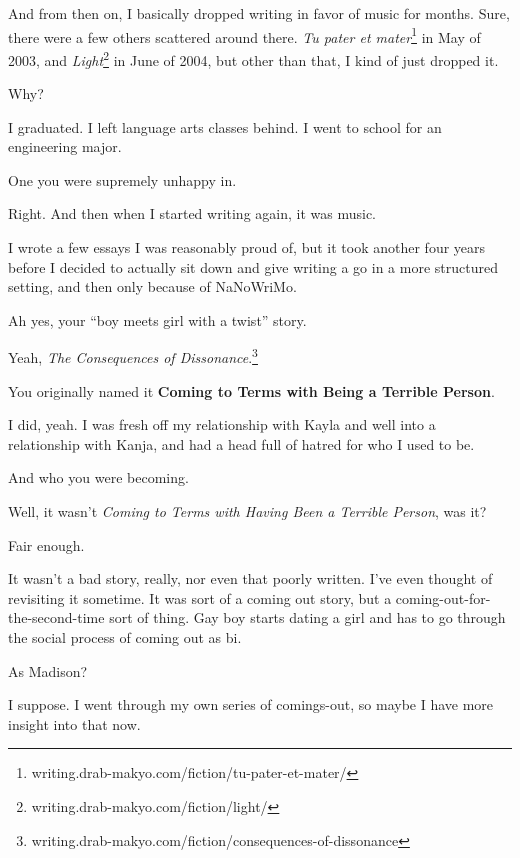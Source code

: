 \begin{paracol}{2}
\begin{leftcolumn}
And from then on, I basically dropped writing in favor of music for months. Sure, there were a few others scattered around there. \emph{Tu pater et mater}\footnote{writing.drab-makyo.com/fiction/tu-pater-et-mater/} in May of 2003, and \emph{Light}\footnote{writing.drab-makyo.com/fiction/light/} in June of 2004, but other than that, I kind of just dropped it.

\begin{ally}
Why?
\end{ally}
I graduated. I left language arts classes behind. I went to school for an engineering major.

\begin{ally}
One you were supremely unhappy in.
\end{ally}
Right. And then when I started writing again, it was music.

I wrote a few essays I was reasonably proud of, but it took another four years before I decided to actually sit down and give writing a go in a more structured setting, and then only because of NaNoWriMo.

\begin{ally}
Ah yes, your ``boy meets girl with a twist'' story.
\end{ally}
Yeah, \emph{The Consequences of Dissonance}.\footnote{writing.drab-makyo.com/fiction/consequences-of-dissonance}

\begin{ally}
You originally named it \textbf{Coming to Terms with Being a Terrible Person}.
\end{ally}
I did, yeah. I was fresh off my relationship with Kayla and well into a relationship with Kanja, and had a head full of hatred for who I used to be.

\begin{ally}
And who you were becoming.
\end{ally}
Well, it wasn't \emph{Coming to Terms with Having Been a Terrible Person}, was it?

\begin{ally}
Fair enough.
\end{ally}
It wasn't a bad story, really, nor even that poorly written. I've even thought of revisiting it sometime. It was sort of a coming out story, but a coming-out-for-the-second-time sort of thing. Gay boy starts dating a girl and has to go through the social process of coming out as bi.

\begin{ally}
As Madison?
\end{ally}
I suppose. I went through my own series of comings-out, so maybe I have more insight into that now.


\end{leftcolumn}
\end{paracol}
